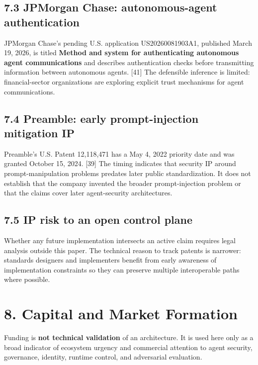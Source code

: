 \documentclass[
  10pt,
  letterpaper,
]{article}
\begin{document}
\subsection{7.3 JPMorgan Chase: autonomous-agent
authentication}\label{jpmorgan-chase-autonomous-agent-authentication}

JPMorgan Chase's pending U.S. application US20260081903A1, published
March 19, 2026, is titled \textbf{Method and system for authenticating
autonomous agent communications} and describes authentication checks
before transmitting information between autonomous agents. {[}41{]} The
defensible inference is limited: financial-sector organizations are
exploring explicit trust mechanisms for agent communications.

\subsection{7.4 Preamble: early prompt-injection mitigation
IP}\label{preamble-early-prompt-injection-mitigation-ip}

Preamble's U.S. Patent 12,118,471 has a May 4, 2022 priority date and
was granted October 15, 2024. {[}39{]} The timing indicates that
security IP around prompt-manipulation problems predates later public
standardization. It does not establish that the company invented the
broader prompt-injection problem or that the claims cover later
agent-security architectures.

\subsection{7.5 IP risk to an open control
plane}\label{ip-risk-to-an-open-control-plane}

Whether any future implementation intersects an active claim requires
legal analysis outside this paper. The technical reason to track patents
is narrower: standards designers and implementers benefit from early
awareness of implementation constraints so they can preserve multiple
interoperable paths where possible.

\section{8. Capital and Market
Formation}\label{capital-and-market-formation}

Funding is \textbf{not technical validation} of an architecture. It is
used here only as a broad indicator of ecosystem urgency and commercial
attention to agent security, governance, identity, runtime control, and
adversarial evaluation.
\end{document}

